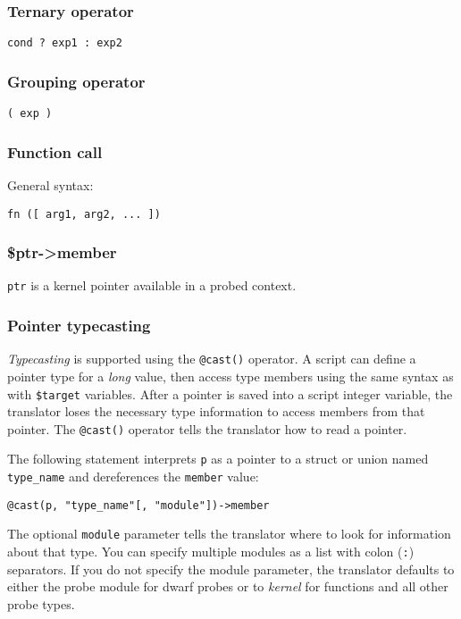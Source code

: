 \documentclass[twoside,english]{article}
\newenvironment{vindent}
{\begin{list}{}{\setlength{\listparindent}{6pt}}
\item[]}
{\end{list}}
\begin{document}
\subsubsection{Ternary operator\label{sub:Ternary-operator}}
\texttt{cond ? exp1 : exp2}


\subsubsection{Grouping operator}
\texttt{( exp )}


\subsubsection{Function call}
General syntax:

\texttt{fn ({[} arg1, arg2, ... ])}


\subsubsection{\$ptr-\textgreater member}
\texttt{ptr} is a kernel pointer available in a probed context.


\subsubsection{Pointer typecasting}

\emph{Typecasting} is supported using the \texttt{@cast()} operator. A
script can define a pointer type for a \emph{long} value, then access
type members using the same syntax as with \texttt{\$target}
variables. After a pointer is saved into a script integer variable,
the translator loses the necessary type information to access members
from that pointer.  The \texttt{@cast()} operator tells the translator
how to read a pointer.

The following statement interprets \texttt{p} as a pointer to a struct
or union named \texttt{type\_name} and dereferences the
\texttt{member} value:
\begin{vindent}
\begin{verbatim}
@cast(p, "type_name"[, "module"])->member
\end{verbatim}
\end{vindent}

The optional \texttt{module} parameter tells the translator where to
look for information about that type. You can specify multiple modules
as a list with colon (\texttt{:}) separators. If you do not specify
the module parameter, the translator defaults to either the probe
module for dwarf probes or to \textit{kernel} for functions and all
other probe types.
\end{document}
